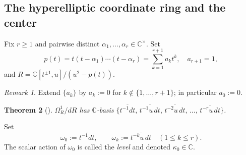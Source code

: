 \documentclass{amsart}
\newcommand{\Cx}{\mathbb{C}}
\newcommand{\ol}{\overline}
\newtheorem{theorem}{Theorem}[section]
\theoremstyle{definition}
\theoremstyle{remark}
\newtheorem{remark}[theorem]{Remark}
\numberwithin{equation}{section}
\begin{document}
\subsection{The hyperelliptic coordinate ring and the center}
Fix $r\ge1$ and pairwise distinct $\alpha_1,\dots,\alpha_r\in\Cx^\times$.
Set
\[
p(t)=t(t-\alpha_1)\cdots(t-\alpha_r)=\sum_{k=1}^{r+1}a_kt^k,\quad a_{r+1}=1,
\]
and $R=\Cx[t^{\pm1},u]/(u^2-p(t))$.
\begin{remark}\label{rem:ak-convention}
Extend $\{a_k\}$ by $a_k:=0$ for $k\notin\{1,\dots,r+1\}$; in
particular $a_0:=0$.
\end{remark}
\begin{theorem}[{\cite[Th.~3.1]{cox2017module}}]\label{thm:center-basis}
$\Omega_R^1/dR$ has $\Cx$-basis
$\{\ol{t^{-1}dt},\,\ol{t^{-1}u\,dt},\,\ol{t^{-2}u\,dt},\,\dots,\,
\ol{t^{-r}u\,dt}\}$.
\end{theorem}
Set
\begin{equation}\label{eq:omega-def}
\omega_0:=\ol{t^{-1}dt},\qquad
\omega_k:=\ol{t^{-k}u\,dt}\quad(1\le k\le r).
\end{equation}
The scalar action of $\omega_0$ is called the \emph{level} and denoted
$\kappa_0\in\Cx$.
\end{document}
